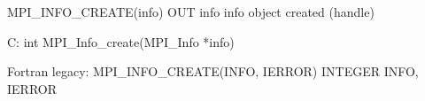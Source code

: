 MPI_INFO_CREATE(info)
OUT info        info object created (handle)

C:
int MPI_Info_create(MPI_Info *info)

Fortran legacy:
MPI_INFO_CREATE(INFO, IERROR)
INTEGER INFO, IERROR 
